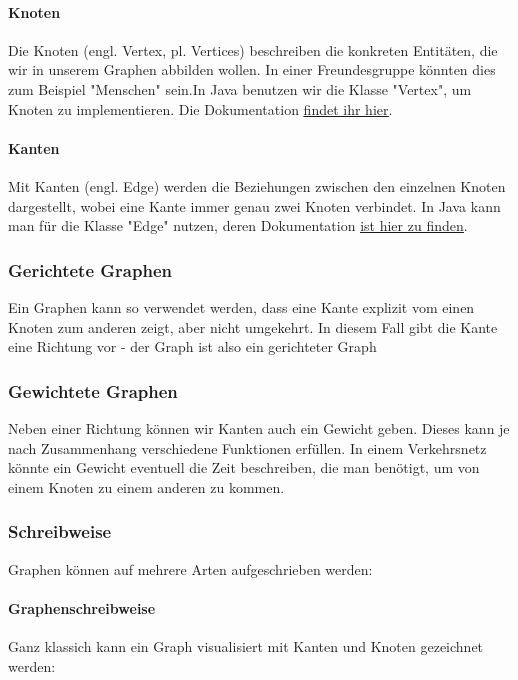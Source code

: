 \documentclass{article}
\begin{document}
	\paragraph{Knoten}
	Die Knoten (engl. Vertex, pl. Vertices) beschreiben die konkreten Entitäten, die wir in unserem Graphen abbilden wollen. In einer Freundesgruppe könnten dies zum Beispiel "Menschen" sein.In Java benutzen wir die Klasse "Vertex", um Knoten zu implementieren. Die Dokumentation \href{https://www.schulentwicklung.nrw.de/lehrplaene/upload/klp_SII/if/Dokumentation_ZA-IF_GK-LK_ab_2018_2021_12_22.pdf#page=29}{\underline{findet ihr hier}}.

	\paragraph{Kanten}
	Mit Kanten (engl. Edge) werden die Beziehungen zwischen den einzelnen Knoten dargestellt, wobei eine Kante immer genau zwei Knoten verbindet. In Java kann man für die Klasse "Edge" nutzen, deren Dokumentation \href{https://www.schulentwicklung.nrw.de/lehrplaene/upload/klp_SII/if/Dokumentation_ZA-IF_GK-LK_ab_2018_2021_12_22.pdf#page=30}{\underline{ist hier zu finden}}.

	\subsubsection{Gerichtete Graphen}
	Ein Graphen kann so verwendet werden, dass eine Kante explizit vom einen Knoten zum anderen zeigt, aber nicht umgekehrt. In diesem Fall gibt die Kante eine Richtung vor - der Graph ist also ein gerichteter Graph

	\subsubsection{Gewichtete Graphen}
	Neben einer Richtung können wir Kanten auch ein Gewicht geben. Dieses kann je nach Zusammenhang verschiedene Funktionen erfüllen. In einem Verkehrsnetz könnte ein Gewicht eventuell die Zeit beschreiben, die man benötigt, um von einem Knoten zu einem anderen zu kommen.

	\subsubsection{Schreibweise}
	Graphen können auf mehrere Arten aufgeschrieben werden:
	
	\paragraph{Graphenschreibweise}
	Ganz klassich kann ein Graph visualisiert mit Kanten und Knoten gezeichnet werden:
\end{document}
